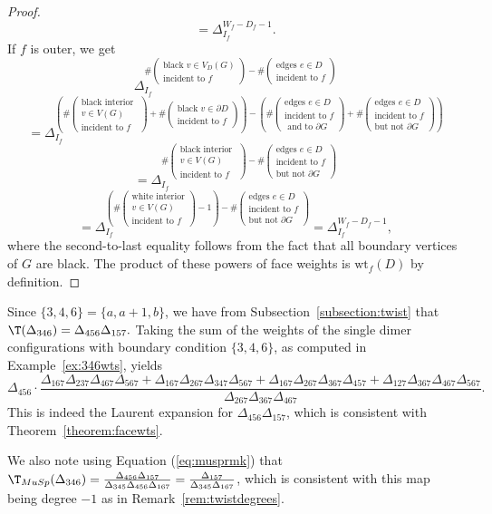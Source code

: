 \begin{proof}
\[ =\Delta_{I_f}^{W_f-D_f-1}.\]
If $f$ is outer, 
we get
\[\Delta_{I_f}^{\#\left(\substack{\text{black }v \in V_D(G)\\\text{incident to }f}\right)-\#\left(\substack{\text{edges }e \in D\\\text{incident to }f}\right)}
\]\[=\Delta_{I_f}^{\left(\#\left(\substack{\text{black interior }\\v \in V(G)\\\text{incident to }f}\right)+\#\left(\substack{\text{black }v \in \partial D\\\text{incident to }f}\right)\right)-\left(\#\left(\substack{\text{edges }e \in D\\\text{incident to }f \\\text{~and~to~}\partial G}\right)+\#\left(\substack{\text{edges }e \in D\\\text{incident to }f\\\text{but not }\partial G}\right)\right)}\]
\[=\Delta_{I_f}^{\#\left(\substack{\text{black interior }\\v \in V(G)\\\text{incident to }f}\right)-\#\left(\substack{\text{edges }e \in D\\\text{incident to }f\\\text{but not }\partial G}\right)}\]
\[=\Delta_{I_f}^{\left(\#\left(\substack{\text{white interior}\\v \in V(G)\\\text{incident to }f}\right)-1\right)-\#\left(\substack{\text{edges }e \in D\\\text{incident to }f\\\text{but not }\partial G}\right)}=\Delta_{I_f}^{W_f-D_f-1},\]
where the second-to-last equality follows from the fact that all boundary vertices of $G$ are black.
The product of these powers of face weights is $\text{wt}_f(D)$ by definition.
\end{proof}


\begin{exam}
Since $\{3,4,6\}=\{a,a+1,b\}$, we have from Subsection~\ref{subsection:twist} that $\T(\Delta_{346})= \Delta_{456}\Delta_{157}.$ Taking the sum of the weights of the single dimer configurations with boundary condition $\{3,4,6\}$, as computed in Example~\ref{ex:346wts}, yields
{\small\[ \Delta_{456} \cdot \dfrac{\Delta_{167}\Delta_{237}\Delta_{467}\Delta_{567}+\Delta_{167}\Delta_{267}\Delta_{347}\Delta_{567} + \Delta_{167}\Delta_{267}\Delta_{367}\Delta_{457}+\Delta_{127}\Delta_{367}\Delta_{467}\Delta_{567}}{\Delta_{267}\Delta_{367}\Delta_{467}}.\]}
This is indeed the Laurent expansion for $\Delta_{456}\Delta_{157}$, which is consistent with Theorem~\ref{theorem:facewts}.

We also note using Equation (\ref{eq:musprmk}) that $\T_{MuSp}(\Delta_{346}) = \frac{\Delta_{456}\Delta_{157}}{\Delta_{345}\Delta_{456}\Delta_{167}}
= \frac{\Delta_{157}}{\Delta_{345}\Delta_{167}}$, which is consistent with this map being degree $-1$ as in Remark~\ref{rem:twistdegrees}.
\end{exam}


